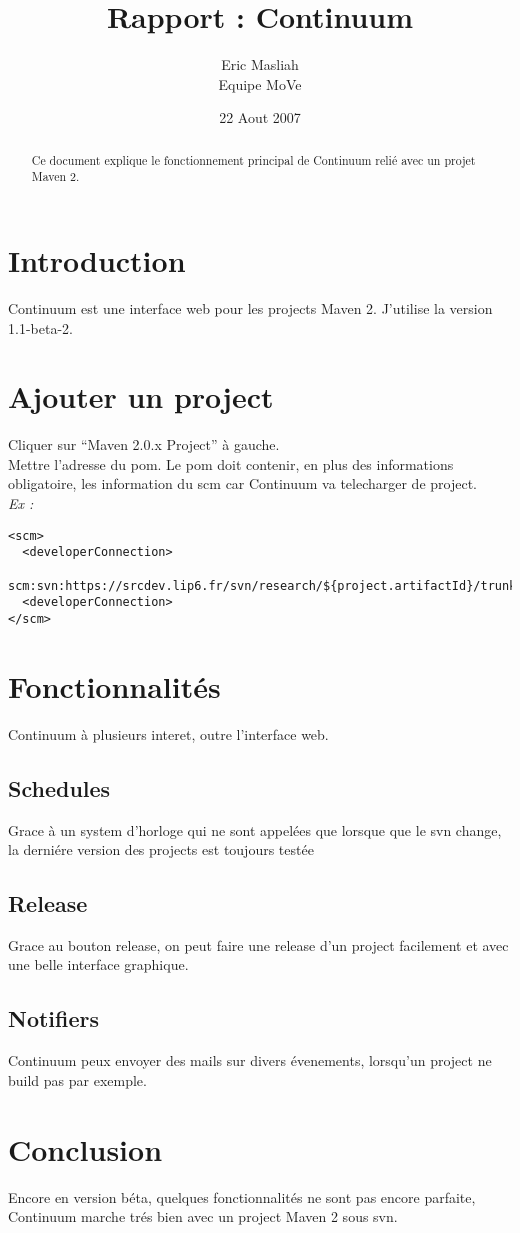 \documentclass[a4paper,10pt]{article}
\title{Rapport : Continuum}
\author{Eric Masliah\\
Equipe MoVe}
\date{22 Aout 2007}
\begin{document}
\maketitle

\begin{abstract}
Ce document explique le fonctionnement principal de Continuum relié avec un projet Maven 2.
\end{abstract}

\section{Introduction}
Continuum est une interface web pour les projects Maven 2. J'utilise la version 1.1-beta-2.

\section{Ajouter un project}
Cliquer sur ``Maven 2.0.x Project'' à gauche.\\
Mettre l'adresse du pom. Le pom doit contenir, en plus des informations obligatoire, les information du scm car Continuum va telecharger de project.\\
\textit{Ex : }
\begin{verbatim}
<scm>
  <developerConnection>
     scm:svn:https://srcdev.lip6.fr/svn/research/${project.artifactId}/trunk
  <developerConnection>
</scm>
\end{verbatim}

\section{Fonctionnalités}
Continuum à plusieurs interet, outre l'interface web.

\subsection{Schedules}
Grace à un system d'horloge qui ne sont appelées que lorsque que le svn change, la derniére version des projects est toujours testée

\subsection{Release}
Grace au bouton release, on peut faire une release d'un project facilement et avec une belle interface graphique.

\subsection{Notifiers}
Continuum peux envoyer des mails sur divers évenements, lorsqu'un project ne build pas par exemple.

\section{Conclusion}
Encore en version béta, quelques fonctionnalités ne sont pas encore parfaite, Continuum marche trés bien avec un project Maven 2 sous svn.
\end{document}
